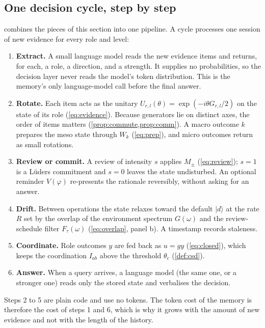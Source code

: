 \documentclass[11pt]{article}
\theoremstyle{definition}
\theoremstyle{remark}
\newcommand{\ket}[1]{\lvert #1\rangle}
\begin{document}
\subsection{One decision cycle, step by step}
\label{sec:cycle}
 combines the pieces of this section into one pipeline. A cycle processes one session of new evidence for every role and level:
\begin{enumerate}
\item \textbf{Extract.} A small language model reads the new evidence items and returns, for each, a role, a direction, and a strength. It supplies no probabilities, so the decision layer never reads the model's token distribution. This is the memory's only language-model call before the final answer.
\item \textbf{Rotate.} Each item acts as the unitary $U_{r,l}(\theta)=\exp(-i\theta G_{r,l}/2)$ on the state of its role (\cref{eq:evidence}). Because generators lie on distinct axes, the order of items matters (\cref{prop:commute,prop:comm}). A macro outcome $k$ prepares the meso state through $W_k$ (\cref{eq:prep}), and micro outcomes return as small rotations.
\item \textbf{Review or commit.} A review of intensity $s$ applies $M_\pm$ (\cref{eq:review}); $s=1$ is a L\"uders commitment and $s=0$ leaves the state undisturbed. An optional reminder $V(\varphi)$ re-presents the rationale reversibly, without asking for an answer.
\item \textbf{Drift.} Between operations the state relaxes toward the default $\ket{d}$ at the rate $R$ set by the overlap of the environment spectrum $G(\omega)$ and the review-schedule filter $F_\tau(\omega)$ (\cref{eq:overlap}, panel b). A timestamp records staleness.
\item \textbf{Coordinate.} Role outcomes $y$ are fed back as $u=gy$ (\cref{eq:closed}), which keeps the coordination $I_{ab}$ above the threshold $\theta_c$ (\cref{def:csd}).
\item \textbf{Answer.} When a query arrives, a language model (the same one, or a stronger one) reads only the stored state and verbalises the decision.
\end{enumerate}
Steps 2 to 5 are plain code and use no tokens. The token cost of the memory is therefore the cost of steps 1 and 6, which is why it grows with the amount of new evidence and not with the length of the history.
\end{document}

